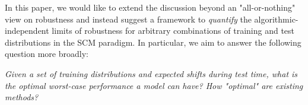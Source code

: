 



In this paper, we would like to extend the discussion beyond an
"all-or-nothing" view on robustness and instead suggest a framework to \emph{quantify} the algorithmic-independent limits of robustness for 
arbitrary 
combinations of training and test distributions in the SCM paradigm.
In particular, we aim to answer the following question more broadly:
\begin{center}
\emph{Given a set of training distributions and expected shifts during test time, what is the optimal worst-case performance a model can have? How "optimal" are existing methods?}

\end{center}

